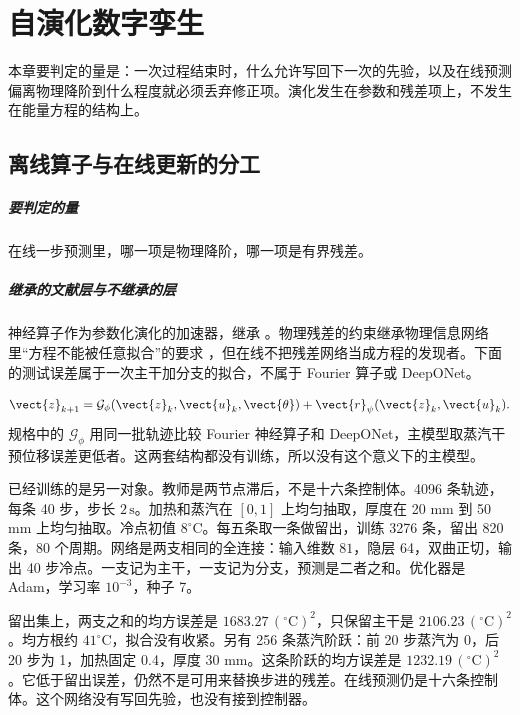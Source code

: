 \chapter{自演化数字孪生}
\label{ch:evolve}

本章要判定的量是：一次过程结束时，什么允许写回下一次的先验，以及在线预测偏离物理降阶到什么程度就必须丢弃修正项。演化发生在参数和残差项上，不发生在能量方程的结构上。

\section{离线算子与在线更新的分工}

\paragraph{要判定的量}
在线一步预测里，哪一项是物理降阶，哪一项是有界残差。

\paragraph{继承的文献层与不继承的层}
神经算子作为参数化演化的加速器，继承 \cite{li2021fno,lu2021deeponet}。物理残差的约束继承物理信息网络里“方程不能被任意拟合”的要求 \cite{raissi2019}，但在线不把残差网络当成方程的发现者。下面的测试误差属于一次主干加分支的拟合，不属于 Fourier 算子或 DeepONet。

\begin{equation}
\label{eq:op}
\vect{z}_{k+1}=\mathcal{G}_{\phi}(\vect{z}_k,\vect{u}_k,\vect{\theta})+\vect{r}_{\psi}(\vect{z}_k,\vect{u}_k).
\end{equation}
规格中的 \(\mathcal{G}_{\phi}\) 用同一批轨迹比较 Fourier 神经算子和 DeepONet，主模型取蒸汽干预位移误差更低者。这两套结构都没有训练，所以没有这个意义下的主模型。

已经训练的是另一对象。教师是两节点滞后，不是十六条控制体。4096 条轨迹，每条 40 步，步长 \(2\,\mathrm{s}\)。加热和蒸汽在 \([0,1]\) 上均匀抽取，厚度在 20 mm 到 50 mm 上均匀抽取。冷点初值 \(8^\circ\mathrm{C}\)。每五条取一条做留出，训练 3276 条，留出 820 条，80 个周期。网络是两支相同的全连接：输入维数 \(81\)，隐层 64，双曲正切，输出 40 步冷点。一支记为主干，一支记为分支，预测是二者之和。优化器是 Adam，学习率 \(10^{-3}\)，种子 7。

留出集上，两支之和的均方误差是 \(1683.27\,(^\circ\mathrm{C})^2\)，只保留主干是 \(2106.23\,(^\circ\mathrm{C})^2\)。均方根约 \(41^\circ\mathrm{C}\)，拟合没有收紧。另有 256 条蒸汽阶跃：前 20 步蒸汽为 0，后 20 步为 1，加热固定 0.4，厚度 30 mm。这条阶跃的均方误差是 \(1232.19\,(^\circ\mathrm{C})^2\)。它低于留出误差，仍然不是可用来替换步进的残差。在线预测仍是十六条控制体。这个网络没有写回先验，也没有接到控制器。

